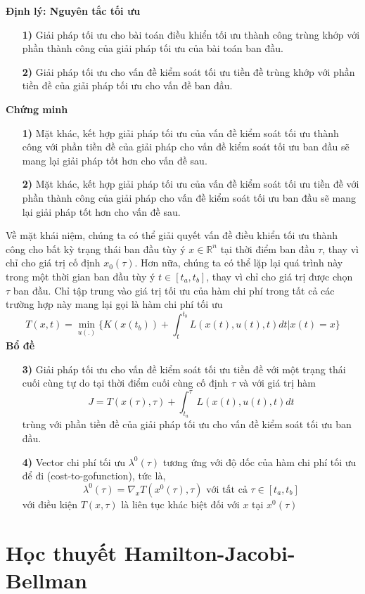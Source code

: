 \documentclass[12pt,a4paper]{report}
\begin{document}
	\textbf{Định lý: Nguyên tắc tối ưu}
	\begin{itemize}
		\item[\textbf{1)}] Giải pháp tối ưu cho bài toán điều khiển tối ưu thành công trùng khớp với phần thành công của giải pháp tối ưu của bài toán ban đầu.
		\item[\textbf{2)}] Giải pháp tối ưu cho vấn đề kiểm soát tối ưu tiền đề trùng khớp với phần tiền đề của giải pháp tối ưu cho vấn đề ban đầu. 
	\end{itemize}
	\textbf{Chứng minh}
	\begin{itemize}
		\item[\textbf{1)}] Mặt khác, kết hợp giải pháp tối ưu của vấn đề kiểm soát tối ưu thành công với phần tiền đề của giải pháp cho vấn đề kiểm soát tối ưu ban đầu sẽ mang lại giải pháp tốt hơn cho vấn đề sau.
		\item[\textbf{2)}] Mặt khác, kết hợp giải pháp tối ưu của vấn đề kiểm soát tối ưu tiền đề với phần thành công của giải pháp cho vấn đề kiểm soát tối ưu ban đầu sẽ mang lại giải pháp tốt hơn cho vấn đề sau.
	\end{itemize}
	Về mặt khái niệm, chúng ta có thể giải quyết vấn đề điều khiển tối ưu thành công cho bất kỳ trạng thái ban đầu tùy ý $x\in \mathbb{R}^n$ tại thời điểm ban đầu $\tau$, thay vì chỉ cho giá trị cố định $x_0(\tau)$. Hơn nữa, chúng ta có thể lặp lại quá trình này trong một thời gian ban đầu tùy ý $t \in [t_a, t_b]$, thay vì chỉ cho giá trị được chọn $\tau$ ban đầu. Chỉ tập trung vào giá trị tối ưu của hàm chi phí trong tất cả các trường hợp này mang lại gọi là hàm chi phí tối ưu $$T(x,t) = \min_{u(.)} \bigg\{K(x(t_b)) + \int_{t}^{t_b}L(x(t),u(t),t)dt \big | x(t) = x \bigg\}$$
	\textbf{Bổ đề}
	\begin{enumerate}
		\item[\textbf{3)}] Giải pháp tối ưu cho vấn đề kiểm soát tối ưu tiền đề với một
		trạng thái cuối cùng tự do tại thời điểm cuối cùng cố định $\tau$ và với giá trị hàm $$J = T(x(\tau), \tau) + \int_{t_a}^{\tau}L(x(t), u(t), t)dt$$ trùng với phần tiền đề của giải pháp tối ưu cho vấn đề kiểm soát tối ưu ban đầu.
		\item[\textbf{4)}] Vector chi phí tối ưu $\lambda^0(\tau)$ tương ứng với độ dốc của hàm chi phí tối ưu để đi (cost-to-gofunction), tức là, $$\lambda^0(\tau) = \nabla _xT(x^0(\tau), \tau) \text{ với tất cả } \tau \in [t_a, t_b]$$ với điều kiện $T(x, \tau) $ là liên tục khác biệt đối với $x$ tại $x^0(\tau)$
	\end{enumerate}
	\section{Học thuyết Hamilton-Jacobi-Bellman}
\end{document}
